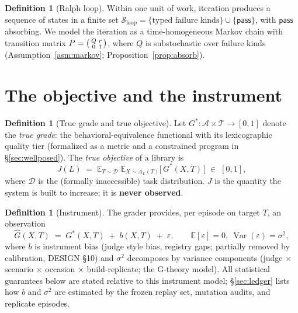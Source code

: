 \documentclass[11pt]{article}
\theoremstyle{plain}
\theoremstyle{definition}
\newtheorem{definition}[theorem]{Definition}
\theoremstyle{remark}
\newcommand{\E}{\mathbb{E}}
\newcommand{\cT}{\mathcal{T}}
\newcommand{\cS}{\mathcal{S}}
\newcommand{\cD}{\mathcal{D}}
\newcommand{\cA}{\mathcal{A}}
\begin{document}
\begin{definition}[Ralph loop]\label{def:ralph}
Within one unit of work, iteration produces a sequence of states in a finite
set $\cS_{\mathrm{loop}} = \{\text{typed failure kinds}\} \cup
\{\textsf{pass}\}$, with $\textsf{pass}$ absorbing. We model the iteration as
a time-homogeneous Markov chain with transition matrix
$P = \begin{psmallmatrix} Q & r \\ 0 & 1 \end{psmallmatrix}$,
where $Q$ is substochastic over failure kinds
(Assumption~\ref{asm:markov}; Proposition~\ref{prop:absorb}).
\end{definition}

\section{The objective and the instrument}\label{sec:objective}

\begin{definition}[True grade and true objective]\label{def:objective}
Let $G^\ast : \cA \times \cT \to [0,1]$ denote the \emph{true grade}: the
behavioral-equivalence functional with its lexicographic quality tier
(formalized as a metric and a constrained program in
\S\ref{sec:wellposed}). The \emph{true objective} of a library is
\[
  J(L) \;=\; \E_{T \sim \cD}\;\E_{X \sim A_L(T)}\bigl[\,G^\ast(X, T)\,\bigr]
  \;\in\; [0,1],
\]
where $\cD$ is the (formally inaccessible) task distribution. $J$ is the
quantity the system is built to increase; it is \textbf{never observed}.
\end{definition}

\begin{definition}[Instrument]\label{def:instrument}
The grader provides, per episode on target $T$, an observation
\[
  \widehat{G}(X, T) \;=\; G^\ast(X, T) \;+\; b(X, T) \;+\; \varepsilon,
  \qquad \E[\varepsilon] = 0,\ \operatorname{Var}(\varepsilon) = \sigma^2,
\]
where $b$ is instrument bias (judge style bias, registry gaps; partially
removed by calibration, DESIGN \S10) and $\sigma^2$ decomposes by variance
components (judge $\times$ scenario $\times$ occasion $\times$
build-replicate; the G-theory model). All statistical guarantees below are
stated relative to this instrument model; \S\ref{sec:ledger} lists how $b$
and $\sigma^2$ are estimated by the frozen replay set, mutation audits, and
replicate episodes.
\end{definition}
\end{document}

